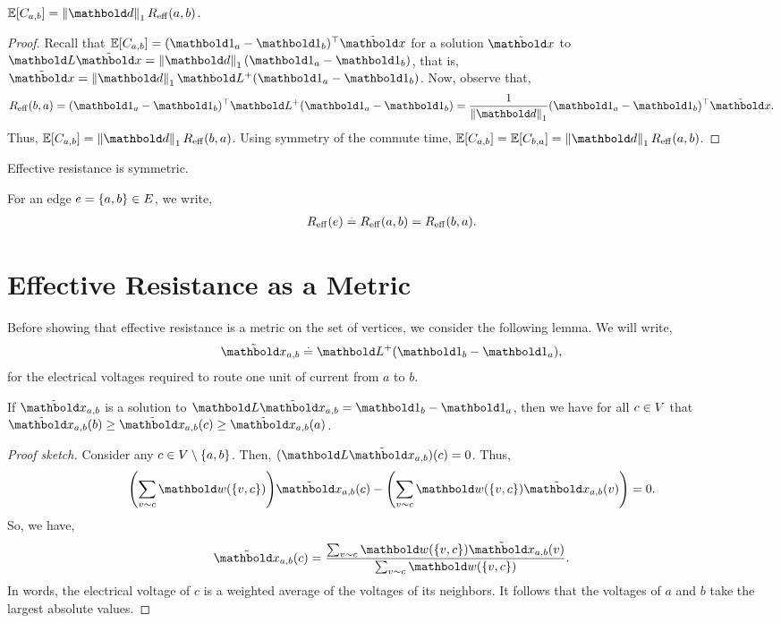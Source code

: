 \begin{lem}
$\E{C_{a,b}} = \norm{\vd}_1 \Reff(a,b)$.
\end{lem}
\begin{proof} Recall that $\E{C_{a,b}} = \trans{(\vOne_a - \vOne_b)}\elx$ for a solution $\elx$ to $\mL\elx = \norm{\vd}_1 (\vOne_a - \vOne_b)$, that is, $\elx = \norm{\vd}_1\pinv{\mL}(\vOne_a - \vOne_b)$. Now, observe that, \begin{align*}
    \Reff(b,a) = \trans{(\vOne_a - \vOne_b)}\pinv{\mL}(\vOne_a - \vOne_b) = \frac{1}{\norm{\vd}_1}\trans{(\vOne_a - \vOne_b)}\elx.
\end{align*} Thus, $\E{C_{a,b}} = \norm{\vd}_1 \Reff(b,a)$. Using symmetry of the commute time, $\E{C_{a,b}} = \E{C_{b,a}} = \norm{\vd}_1 \Reff(a,b)$.
\end{proof}

\begin{cor}\label{cor:effective_resistance_symmetric}
Effective resistance is symmetric.
\end{cor}
\begin{rmk}
For an edge $e = \{a,b\} \in E$, we write, \begin{align}
    R_\mathrm{eff}(e) \overset{.}{=} R_\mathrm{eff}(a,b) = R_\mathrm{eff}(b,a).
\end{align}
\end{rmk}

\section{Effective Resistance as a Metric}

Before showing that effective resistance is a metric on the set of vertices, we consider the following lemma. We will write, \begin{align}
    \elx_{a,b} \defeq \pinv{\mL}(\vOne_b - \vOne_a),
\end{align} for the electrical voltages required to route one unit of current from $a$ to $b$.

\begin{lem}\label{lem:voltages_are_weighted_average}
If $\elx_{a,b}$ is a solution to $\mL\elx_{a,b} = \vOne_b - \vOne_a$, then we have for all $c \in V$ that $\elx_{a,b}(b) \geq \elx_{a,b}(c) \geq \elx_{a,b}(a)$.
\end{lem}
\begin{proof}[Proof sketch] Consider any $c \in V \setminus \{a,b\}$. Then, $(\mL\elx_{a,b})(c) = 0$. Thus, \begin{align*}
    \parentheses*{\sum_{v \sim c} \vw(\{v,c\})} \elx_{a,b}(c) - \parentheses*{\sum_{v \sim c} \vw(\{v,c\}) \elx_{a,b}(v)} = 0.
\end{align*} So, we have, \begin{align*}
    \elx_{a,b}(c) = \frac{\sum_{v \sim c} \vw(\{v,c\}) \elx_{a,b}(v)}{\sum_{v \sim c} \vw(\{v,c\})}.
\end{align*} In words, the electrical voltage of $c$ is a weighted average of the voltages of its neighbors. It follows that the voltages of $a$ and $b$ take the largest absolute values.
\end{proof}

